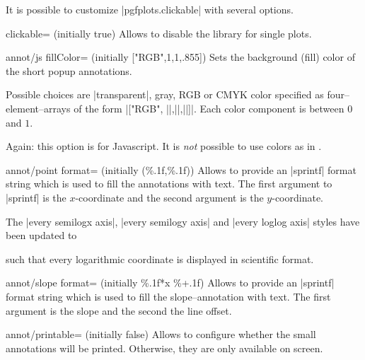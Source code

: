 It is possible to customize |pgfplots.clickable| with several options.

\begin{pgfplotskey}{clickable= (initially true)}
	Allows to disable the library for single plots.
\end{pgfplotskey}

\begin{pgfplotskey}{annot/js fillColor= (initially ["RGB",1,1,.855])}
	Sets the background (fill) color of the short popup annotations. 
	
	Possible choices are |transparent|, gray, RGB or CMYK color specified as four--element--arrays of the form
	|["RGB", ||,||,||]|. Each color component is between $0$ and $1$.

	Again: this option is for Javascript. It is \emph{not} possible to use colors as in \pgfname.
\end{pgfplotskey}

\begin{pgfplotskey}{annot/point format= (initially {(\%.1f,\%.1f)})}
	Allows to provide an |sprintf| format string which is used to fill the annotations with text. 
	The first argument to |sprintf| is the $x$-coordinate and the second argument is the $y$-coordinate.

	The |every semilogx axis|, |every semilogy axis| and |every loglog axis| styles have been updated to
\begin{codeexample}
\end{codeexample}
	\noindent such that every logarithmic coordinate is displayed in scientific format.
\end{pgfplotskey}

\begin{pgfplotskey}{annot/slope format= (initially \%.1f*x \%+.1f)}
	Allows to provide an |sprintf| format string which is used to fill the slope--annotation with text.
	The first argument is the slope and the second the line offset.
\end{pgfplotskey}

\begin{pgfplotskey}{annot/printable= (initially false)}
	Allows to configure whether the small annotations will be printed. Otherwise, they are only available on screen.
\end{pgfplotskey}

